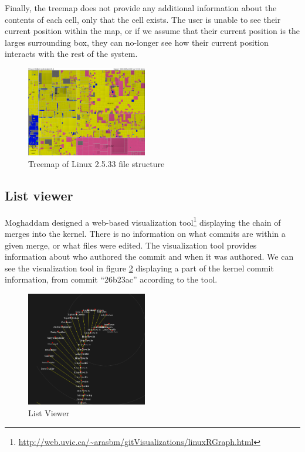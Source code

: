 \documentclass[conference, draftclsnofoot]{IEEEtran}
\begin{document}
Finally, the treemap does not provide any additional information about the
contents of each cell, only that the cell exists. The user is unable to see
their current position within the map, or if we assume that their current
position is the larges surrounding box, they can no-longer see how their
current position interacts with the rest of the system.

\begin{figure}[h]
	\centering
	\includegraphics[width=0.47\textwidth]{figures/kernel-files.png}
	\caption{Treemap of Linux 2.5.33 file structure}
	\label{fig:treemap}
\end{figure}

\subsection{List viewer}
Moghaddam designed a web-based visualization
tool\footnote{\url{http://web.uvic.ca/~arasbm/gitVisualizations/linuxRGraph.html}}
displaying the chain of merges into the kernel. There is no information on what
commits are within a given merge, or what files were edited. The visualization
tool provides information about who authored the commit and when it was
authored. We can see the visualization tool in figure \ref{fig:listviewer}
displaying a part of the kernel commit information, from commit ``26b23ac''
according to the tool.


\begin{figure}[h]
	\centering
	\includegraphics[width=0.47\textwidth]{figures/gitvis.png}
	\caption{List Viewer}
	\label{fig:listviewer}
\end{figure}
\end{document}
